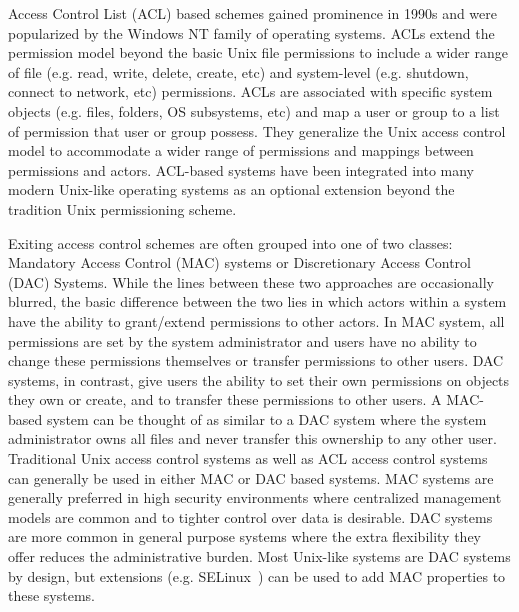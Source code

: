 Access Control List (ACL) based schemes gained prominence in 1990s and
were popularized by the Windows NT family of operating systems. ACLs
extend the permission model beyond the basic Unix file permissions to
include a wider range of file (e.g. read, write, delete, create, etc)
and system-level (e.g. shutdown, connect to network, etc)
permissions. ACLs are associated with specific system objects
(e.g. files, folders, OS subsystems, etc) and map a user or group to a
list of permission that user or group possess. They generalize the
Unix access control model to accommodate a wider range of permissions
and mappings between permissions and actors. ACL-based systems have
been integrated into many modern Unix-like operating systems as an
optional extension beyond the tradition Unix permissioning scheme.

Exiting access control schemes are often grouped into one of two
classes: Mandatory Access Control (MAC) systems or Discretionary
Access Control (DAC) Systems. While the lines between these two
approaches are occasionally blurred, the basic difference between the
two lies in which actors within a system have the ability to
grant/extend permissions to other actors. In MAC system, all
permissions are set by the system administrator and users have no
ability to change these permissions themselves or transfer permissions
to other users. DAC systems, in contrast, give users the ability to
set their own permissions on objects they own or create, and to
transfer these permissions to other users. A MAC-based system can be
thought of as similar to a DAC system where the system administrator
owns all files and never transfer this ownership to any other
user. Traditional Unix access control systems as well as ACL access
control systems can generally be used in either MAC or DAC based
systems. MAC systems are generally preferred in high security
environments where centralized management models are common and to
tighter control over data is desirable. DAC systems are more common in
general purpose systems where the extra flexibility they offer reduces
the administrative burden. Most Unix-like systems are DAC systems by
design, but extensions (e.g. SELinux~\cite{Loscocco2001}) can be used
to add MAC properties to these systems.

